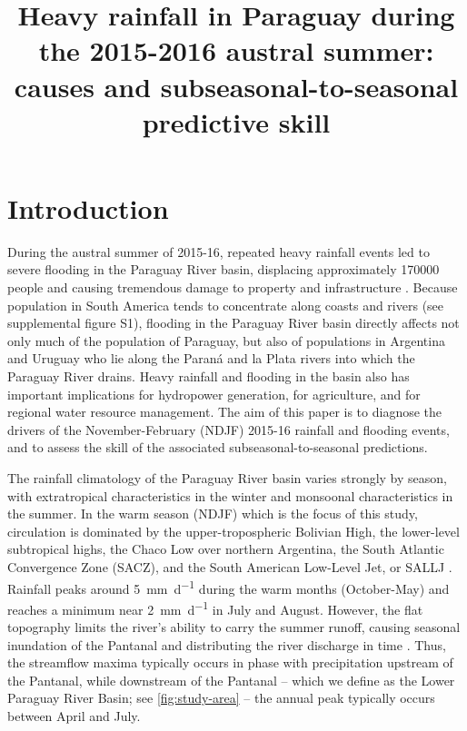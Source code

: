 \documentclass[twocol]{ametsoc}
\title{Heavy rainfall in Paraguay during the 2015-2016 austral summer: causes and subseasonal-to-seasonal predictive skill}
\affiliation{Columbia Water Center. Dept. of Earth and Environmental Engineering, Columbia University, 500 W. 120th St., New York, NY. USA \\ Columbia Water Center, Columbia University, 500 W. 120th St., New York, NY. USA}
\begin{document}
\maketitle


\section{Introduction}

During the austral summer of 2015-16, repeated heavy rainfall events led to severe flooding in the Paraguay River basin, displacing approximately \num{170000} people \citep{BrackenridgeDFO} and causing tremendous damage to property and infrastructure \citep{MinisteriodeObrasPublicasyComunicacion:2016tq}.
Because population in South America tends to concentrate along coasts and rivers (see supplemental figure S1), flooding in the Paraguay River basin directly affects not only much of the population of Paraguay, but also of populations in Argentina and Uruguay who lie along the Paran\'{a} and la Plata rivers into which the Paraguay River drains.
Heavy rainfall and flooding in the basin also has important implications for hydropower generation, for agriculture, and for regional water resource management.
The aim of this paper is to diagnose the drivers of the November-February (NDJF) 2015-16 rainfall and flooding events, and to assess the skill of the associated subseasonal-to-seasonal predictions.

The rainfall climatology of the Paraguay River basin varies strongly by season, with extratropical characteristics in the winter and monsoonal characteristics in the summer.
In the warm season (NDJF) which is the focus of this study, circulation is dominated by the upper-tropospheric Bolivian High, the lower-level subtropical highs, the Chaco Low over northern Argentina, the South Atlantic Convergence Zone (SACZ), and the South American Low-Level Jet, or SALLJ \citep{Grimm2009,Marengo:2012cm}.
Rainfall peaks around \SI{5}{\milli\meter\per\day} during the warm months (October-May) and reaches a minimum near \SI{2}{\milli\meter\per\day} in July and August.
However, the flat topography limits the river's ability to carry the summer runoff, causing seasonal inundation of the Pantanal and distributing the river discharge in time \citep{Bravo:2011et,Barros:2004bn}.
Thus, the streamflow maxima typically occurs in phase with precipitation upstream of the Pantanal, while downstream of the Pantanal -- which we define as the Lower Paraguay River Basin; see \cref{fig:study-area} -- the annual peak typically occurs between April and July.
\end{document}
